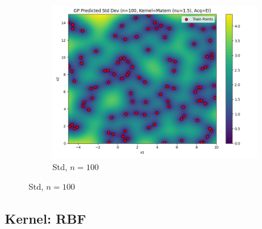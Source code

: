 \documentclass[a4paper,12pt]{article}
\begin{document}
\begin{figure}[H]
\begin{subfigure}{0.3\textwidth}
    \includegraphics[width=\linewidth]{Task-02/images/gp_std_matern_n100_EI.png}
    \caption{Std, $n=100$}
\end{subfigure}
\end{figure}

\subsection*{Kernel: RBF}
\end{document}
